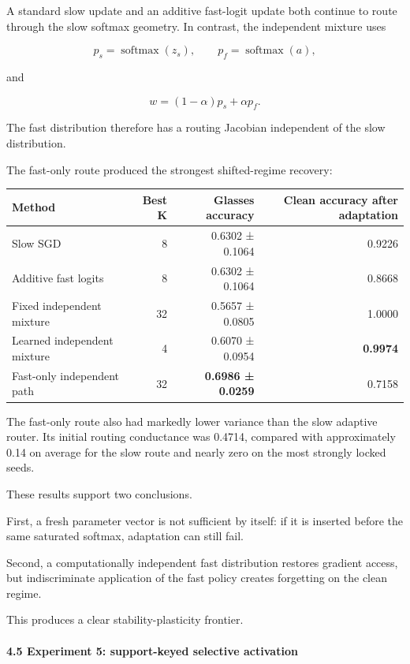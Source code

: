 \documentclass[
  10pt,
]{article}
\begin{document}
A standard slow update and an additive fast-logit update both continue
to route through the slow softmax geometry. In contrast, the independent
mixture uses

\[
p_s=\operatorname{softmax}(z_s), \qquad
p_f=\operatorname{softmax}(a),
\]

and

\[
w=(1-\alpha)p_s+\alpha p_f.
\]

The fast distribution therefore has a routing Jacobian independent of
the slow distribution.

The fast-only route produced the strongest shifted-regime recovery:

\begin{longtable}[]{@{}lrrr@{}}
\toprule\noalign{}
Method & Best K & Glasses accuracy & Clean accuracy after adaptation \\
\midrule\noalign{}
\endhead
\bottomrule\noalign{}
\endlastfoot
Slow SGD & 8 & 0.6302 ± 0.1064 & 0.9226 \\
Additive fast logits & 8 & 0.6302 ± 0.1064 & 0.8668 \\
Fixed independent mixture & 32 & 0.5657 ± 0.0805 & 1.0000 \\
Learned independent mixture & 4 & 0.6070 ± 0.0954 & \textbf{0.9974} \\
Fast-only independent path & 32 & \textbf{0.6986 ± 0.0259} & 0.7158 \\
\end{longtable}

The fast-only route also had markedly lower variance than the slow
adaptive router. Its initial routing conductance was 0.4714, compared
with approximately 0.14 on average for the slow route and nearly zero on
the most strongly locked seeds.

These results support two conclusions.

First, a fresh parameter vector is not sufficient by itself: if it is
inserted before the same saturated softmax, adaptation can still fail.

Second, a computationally independent fast distribution restores
gradient access, but indiscriminate application of the fast policy
creates forgetting on the clean regime.

This produces a clear stability-plasticity frontier.

\hypertarget{experiment-5-support-keyed-selective-activation}{%
\paragraph{4.5 Experiment 5: support-keyed selective
activation}\label{experiment-5-support-keyed-selective-activation}}
\end{document}
